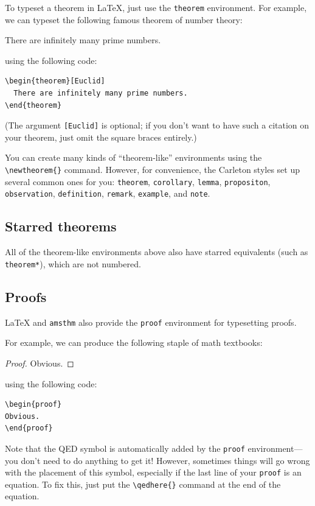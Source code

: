 \documentclass{article}
\newcommand*{\code}[1]{\texttt{#1}}
\begin{document}
To typeset a theorem in \LaTeX{}, just use the \code{theorem} environment.
For example, we can typeset the following famous theorem of number theory:
\begin{theorem}[Euclid]
  \label{thm:euclid}
  There are infinitely many prime numbers.
\end{theorem}
using the following code:
\begin{verbatim}
\begin{theorem}[Euclid]
  There are infinitely many prime numbers.
\end{theorem}
\end{verbatim}
(The argument \code{[Euclid]} is optional; if you don't want to have such a citation on your theorem, just omit the square braces entirely.)

You can create many kinds of \enquote{theorem-like} environments using the \code{\textbackslash{}newtheorem\{\}} command.
However, for convenience, the Carleton styles set up several common ones for you: \code{theorem}, \code{corollary}, \code{lemma}, \code{propositon}, \code{observation}, \code{definition}, \code{remark}, \code{example}, and \code{note}.

\subsection{Starred theorems}
All of the theorem-like environments above also have starred equivalents (such as \code{theorem*}), which are not numbered.

\subsection{Proofs}
\label{s:proofs}
\LaTeX{} and \code{amsthm} also provide the \code{proof} environment for typesetting proofs.

For example, we can produce the following staple of math textbooks:
\begin{proof}
Obvious.
\end{proof}
using the following code:
\begin{verbatim}
\begin{proof}
Obvious.
\end{proof}
\end{verbatim}

Note that the QED symbol is automatically added by the \code{proof} environment---you don't need to do anything to get it!
However, sometimes things will go wrong with the placement of this symbol, especially if the last line of your \code{proof} is an equation.
To fix this, just put the \code{\textbackslash{}qedhere\{\}} command at the end of the equation.
\end{document}
